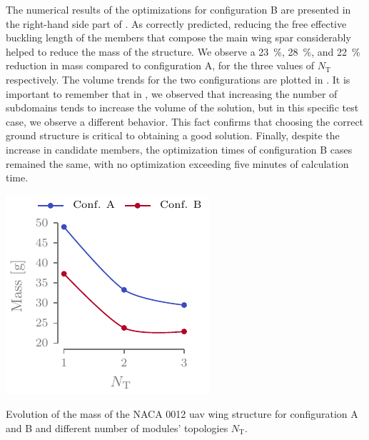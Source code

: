 The numerical results of the optimizations for configuration B are presented in the right-hand side part of . As correctly predicted, reducing the free effective buckling length of the members that compose the main wing spar considerably helped to reduce the mass of the structure. We observe a \qty{23}{\percent}, \qty{28}{\percent}, and \qty{22}{\percent} reduction in mass compared to configuration A, for the three values of $N_\text{T}$ respectively. The volume trends for the two configurations are plotted in . It is important to remember that in , we observed that increasing the number of subdomains tends to increase the volume of the solution, but in this specific test case, we observe a different behavior. This fact confirms that choosing the correct ground structure is critical to obtaining a good solution. Finally, despite the increase in candidate members, the optimization times of configuration B cases remained the same, with no optimization exceeding five minutes of calculation time.

\begin{marginfigure}
    \centering
    \includegraphics[width=\linewidth]{figures/07_aeronautic/00_NACA_vol_crv/vol.pdf}
    \caption{Evolution of the mass of the NACA 0012 \gls{uav} wing structure for configuration A and B and different number of modules' topologies $N_\text{T}$.}
    \label{fig:07_mass_b}
\end{marginfigure}

